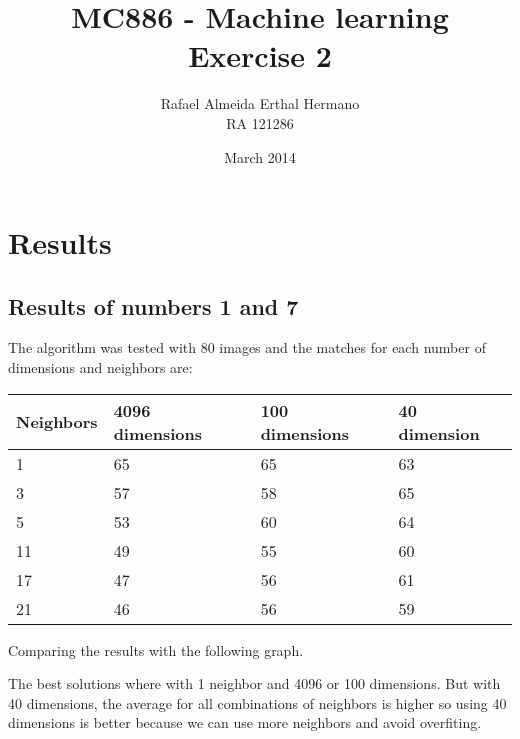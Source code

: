 \documentclass{article}
\title{MC886 - Machine learning \\ Exercise 2}
\author{Rafael Almeida Erthal Hermano\\RA 121286}
\date{March 2014}
\begin{document}
\maketitle
\newpage

\section{Results}
\subsection{Results of numbers 1 and 7}
The algorithm was tested with 80 images and the matches for each number of dimensions and neighbors are:

\begin{table}[h]
\begin{tabular}{|l|l|l|l|}
\hline
Neighbors & 4096 dimensions & 100 dimensions & 40 dimension \\ \hline
1         & 65 & 65 & 63 \\ \hline
3         & 57 & 58 & 65 \\ \hline
5         & 53 & 60 & 64 \\ \hline
11        & 49 & 55 & 60 \\ \hline
17        & 47 & 56 & 61 \\ \hline
21        & 46 & 56 & 59 \\ \hline
\end{tabular}
\end{table}

Comparing the results with the following graph.

\begin{center}
\end{center}

The best solutions where with 1 neighbor and 4096 or 100 dimensions. But with 40 dimensions, the average for all combinations of neighbors is higher so using 40 dimensions is better because we can use more neighbors and avoid overfiting.
\newpage
\end{document}
